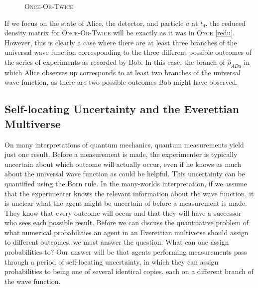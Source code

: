 \documentclass[12pt,onecolumn,secnumarabic,amsmath,amssymb,balancelastpage,nofootinbib]{article}
\begin{document}
\begin{figure}[htb]
\caption{\textsc{Once-Or-Twice}}
\label{case1}
\end{figure}

If we focus on the state of Alice, the detector, and particle $a$ at $t_4$, the reduced density matrix for \textsc{Once-Or-Twice} will be exactly as it was in \textsc{Once} \eqref{redu}.  However, this is clearly a case where there are at least three branches of the universal wave function corresponding to the three different possible outcomes of the series of experiments as recorded by Bob.  In this case, the branch of $\widehat{\rho}_{ADa}$ in which Alice observes up corresponds to at least two branches of the universal wave function, as there are two possible outcomes Bob might have observed.

\subsection{Self-locating Uncertainty and the Everettian Multiverse}\label{sluEM}

On many interpretations of quantum mechanics, quantum measurements yield just one result.  Before a measurement is made, the experimenter is typically uncertain about which outcome will actually occur, even if he knows as much about the universal wave function as could be helpful.  This uncertainty can be quantified using the Born rule.  In the many-worlds interpretation, if we assume that the experimenter knows the relevant information about the wave function, it is unclear what the agent might be uncertain of before a measurement is made.  They know that every outcome will occur and that they will have a successor who sees each possible result.  Before we can discuss the quantitative problem of what numerical probabilities an agent in an Everettian multiverse should assign to different outcomes, we must answer the question: What can one assign probabilities to? Our answer will be that agents performing measurements pass through a period of self-locating uncertainty, in which they can assign probabilities to being one of several identical copies, each on a different branch of the wave function.
\end{document}
